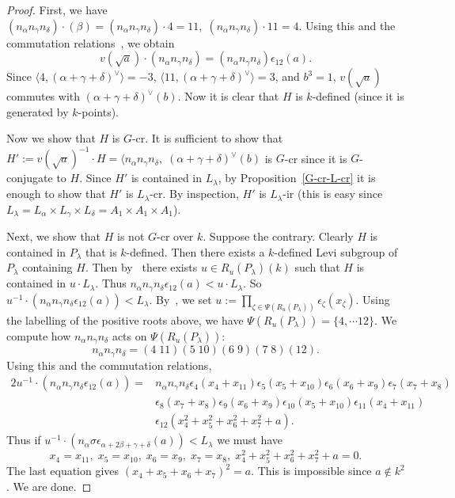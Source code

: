 \begin{proof}
First, we have 
$
(n_\alpha n_\gamma n_\delta) \cdot (\beta) = (n_\alpha n_\gamma n_\delta) \cdot 4 = 11, \;
(n_\alpha n_\gamma n_\delta) \cdot 11 = 4.
$
Using this and the commutation relations~\cite[Lem.~32.5 and Prop.~33.3]{Humphreys-book1}, we obtain
\begin{equation*}
v(\sqrt a)\cdot (n_{\alpha} n_\gamma n_\delta)=(n_\alpha n_\gamma n_\delta) \epsilon_{12}(a).
\end{equation*}
Since $\langle 4, (\alpha+\gamma+\delta)^{\vee}\rangle=-3$, $\langle 11, (\alpha+\gamma+\delta)^{\vee}\rangle=3$, and $b^3=1$, $v(\sqrt a)$ commutes with $(\alpha+\gamma+\delta)^{\vee}(b)$. Now it is clear that $H$ is $k$-defined (since it is generated by $k$-points). 

Now we show that $H$ is $G$-cr. It is sufficient to show that $H':=v(\sqrt a)^{-1}\cdot H=\langle n_\alpha n_\gamma n_\delta,\; (\alpha+\gamma+\delta)^{\vee}(b)$ is $G$-cr since it is $G$-conjugate to $H$. Since $H'$ is contained in $L_\lambda$, by Proposition~\ref{G-cr-L-cr} it is enough to show that $H'$ is $L_\lambda$-cr. By inspection, $H'$ is $L_\lambda$-ir (this is easy since $L_\lambda=L_\alpha\times L_\gamma\times L_\delta=A_1\times A_1 \times A_1$). 


Next, we show that $H$ is not $G$-cr over $k$. Suppose the contrary. Clearly $H$ is contained in $P_\lambda$ that is $k$-defined. Then there exists a $k$-defined Levi subgroup of $P_\lambda$ containing $H$. Then by~\cite[Lem.~2.5()]{Bate-uniform-TransAMS} there exists $u\in R_u(P_\lambda)(k)$ such that $H$ is contained in $u\cdot L_\lambda$. Thus $n_\alpha n_\gamma n_\delta \epsilon_{12}(a) < u\cdot L_\lambda$. So $u^{-1}\cdot (n_\alpha n_\gamma n_\delta \epsilon_{12}(a)) < L_{\lambda}$. By~\cite[Prop.~8.2.1]{Springer-book}, we set
$
u:=\prod_{\zeta\in \Psi(R_u(P_\lambda))}\epsilon_\zeta(x_\zeta).
$
Using the labelling of the positive roots above, we have $\Psi(R_u(P_\lambda))=\{4,\cdots 12\}$. We compute how $n_\alpha n_\gamma n_\delta$ acts on $\Psi(R_u(P_\lambda))$: 
\begin{equation}\label{perm}
n_\alpha n_\gamma n_\delta = (4\;11) (5\;10) (6\;9) (7\;8) (12). 
\end{equation}
Using this and the commutation relations,
\begin{alignat*}{2}
u^{-1}\cdot (n_\alpha n_\gamma n_\delta \epsilon_{12}(a))
=&n_\alpha n_\gamma n_\delta \epsilon_4(x_4+x_{11})\epsilon_{5}(x_5+x_{10})\epsilon_{6}(x_6+x_9)\epsilon_{7}(x_{7}+x_{8})\\
&\epsilon_{8}(x_7+x_8)\epsilon_{9}(x_6+x_{9})\epsilon_{10}(x_5+x_{10})\epsilon_{11}(x_4+x_{11})\\
&\epsilon_{12}(x_{4}^2+x_{5}^2+x_{6}^2+x_{7}^2 +a).
\end{alignat*}
Thus if $u^{-1}\cdot (n_\alpha\sigma \epsilon_{\alpha+2\beta+\gamma+\delta}(a)) < L_{\lambda}$ we must have
\begin{equation*}
x_4=x_{11},\; x_5=x_{10},\; x_{6}=x_{9},\; x_7=x_8,\; x_{4}^2+ x_{5}^2+x_{6}^2+x_{7}^2 +a=0.
\end{equation*}
The last equation gives $(x_4+x_5+x_6+x_7)^2=a$. This is impossible since $a\notin k^2$. We are done. 
\end{proof}


